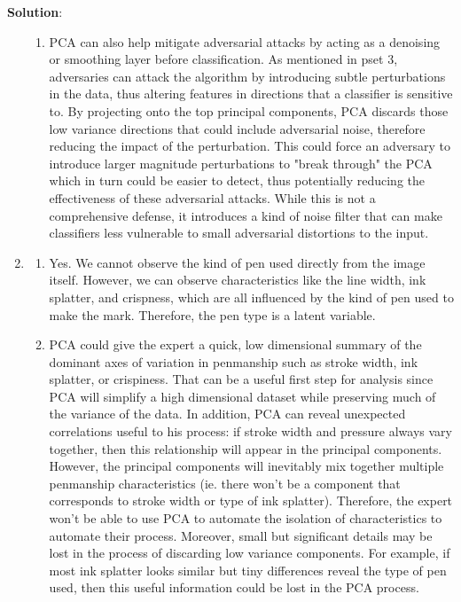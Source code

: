 \documentclass[submit]{../harvardml}
\newenvironment{solution}{
    \vspace{2mm}
    \color{blue}\noindent\textbf{Solution}:
}{}
\begin{document}
\begin{solution}
\begin{enumerate}
\begin{enumerate}
        \item PCA can also help mitigate adversarial attacks by acting as a denoising or smoothing layer before classification. As mentioned in pset 3, adversaries can attack the algorithm by introducing subtle perturbations in the data, thus altering features in directions that a classifier is sensitive to. By projecting onto the top principal components, PCA discards those low variance directions that could include adversarial noise, therefore reducing the impact of the perturbation. This could force an adversary to introduce larger magnitude perturbations to "break through" the PCA which in turn could be easier to detect, thus potentially reducing the effectiveness of these adversarial attacks. While this is not a comprehensive defense, it introduces a kind of noise filter that can make classifiers less vulnerable to small adversarial distortions to the input.
    \end{enumerate}
    \item 
    \begin{enumerate}
        \item Yes. We cannot observe the kind of pen used directly from the image itself. However, we can observe characteristics like the line width, ink splatter, and crispness, which are all influenced by the kind of pen used to make the mark. Therefore, the pen type is a latent variable. 
    
        \item PCA could give the expert a quick, low dimensional summary of the dominant axes of variation in penmanship such as stroke width, ink splatter, or crispiness. That can be a useful first step for analysis since PCA will simplify a high dimensional dataset while preserving much of the variance of the data. In addition, PCA can reveal unexpected correlations useful to his process: if stroke width and pressure always vary together, then this relationship will appear in the principal components. However, the principal components will inevitably mix together multiple penmanship characteristics (ie. there won't be a component that corresponds to stroke width or type of ink splatter). Therefore, the expert won't be able to use PCA to automate the isolation of characteristics to automate their process. Moreover, small but significant details may be lost in the process of discarding low variance components. For example, if most ink splatter looks similar but tiny differences reveal the type of pen used, then this useful information could be lost in the PCA process.
\end{enumerate}

    
\end{enumerate}
\end{solution}
\end{document}
